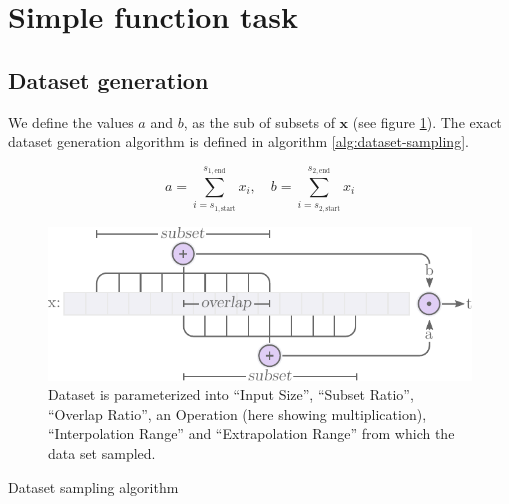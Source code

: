 \section{Simple function task}
\subsection{Dataset generation}
\label{sec:appendix:simple-function-task:data-generation}

We define the values $a$ and $b$, as the sub of subsets of $\mathbf{x}$ (see figure \ref{fig:simple-function-task-problem}). The exact dataset generation algorithm is defined in algorithm \ref{alg:dataset-sampling}.

\begin{equation}
    a = \sum_{i=s_{1,\mathrm{start}}}^{s_{1,\mathrm{end}}} x_i, \quad b = \sum_{i=s_{2,\mathrm{start}}}^{s_{2,\mathrm{end}}} x_i
\end{equation}

\begin{figure}[h]
\centering
\includegraphics[scale=0.8]{graphics/function_task_static_problem.pdf}
\caption{Dataset is parameterized into ``Input Size'', ``Subset Ratio'', ``Overlap Ratio'', an Operation (here showing multiplication), ``Interpolation Range'' and ``Extrapolation Range'' from which the data set sampled.}
\label{fig:simple-function-task-problem}
\end{figure}

\begin{algorithm}[h]
  \caption{Dataset sampling algorithm}
  \begin{algorithmic}[1]
       
       
       
       
       
      \State {}
    \EndFunction
  \end{algorithmic}
  \label{alg:dataset-sampling}
\end{algorithm}

